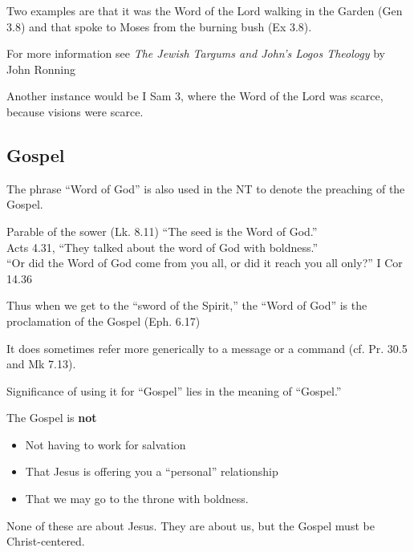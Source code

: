 \documentclass{beamer}
\begin{document}
\begin{frame}
  Two examples are that it was the Word of the Lord walking in the Garden (Gen 3.8) and that spoke to Moses from the burning bush (Ex 3.8).
\end{frame}

\begin{frame}
  For more information see \emph{The Jewish Targums and John's Logos Theology} by John Ronning
\end{frame}

\begin{frame}
  Another instance would be I Sam 3, where the Word of the Lord was scarce, because visions were scarce.
\end{frame}

\subsection{Gospel}

\begin{frame}
  The phrase ``Word of God'' is also used in the NT to denote the preaching of the Gospel.
\end{frame}

\begin{frame}
  Parable of the sower (Lk. 8.11) ``The seed is the Word of God.''\\
  Acts 4.31, ``They talked about the word of God with boldness.''\\
  ``Or did the Word of God come from you all, or did it reach you all only?'' I Cor 14.36
\end{frame}

\begin{frame}
  Thus when we get to the ``sword of the Spirit,'' the ``Word of God'' is the proclamation of the Gospel (Eph. 6.17)
\end{frame}

\begin{frame}
  It does sometimes refer more generically to a message or a command (cf. Pr. 30.5 and Mk 7.13).
\end{frame}

\begin{frame}
  Significance of using it for ``Gospel'' lies in the meaning of ``Gospel.''
\end{frame}

\begin{frame}
  The Gospel is \textbf{not}\pause
  \begin{itemize}
	\item Not having to work for salvation\pause
	\item That Jesus is offering you a ``personal'' relationship\pause
	\item That we may go to the throne with boldness.\pause
  \end{itemize}
  None of these are about Jesus.
  They are about us, but the Gospel must be Christ-centered.
\end{frame}
\end{document}
